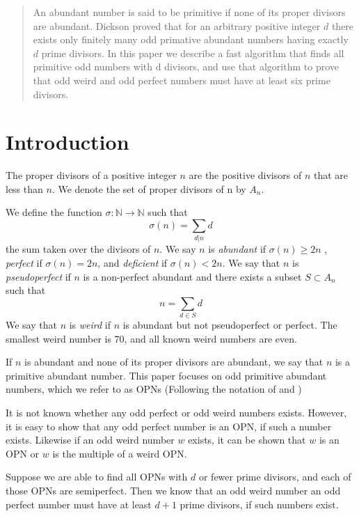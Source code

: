 \documentclass[../paper.tex]{article}
\begin{document}
\begin{abstract}
An abundant number is said to be primitive if none of its proper 
divisors are abundant.  Dickson proved that for an arbitrary
positive integer $d$ there exists only finitely many odd primative
abundant numbers having exactly $d$ prime divisors\cite{dickson}.
In this paper we describe a fast algorithm
that finds all primitive odd numbers with d divisors, and use that
algorithm to prove that odd weird and odd perfect numbers must
have at least six prime divisors.
\end{abstract}

\section{Introduction}
The proper divisors of a positive integer $n$ are the positive
divisors of $n$ that are less than $n$. We denote the set of 
proper divisors of n by $\textit{A}_{n}$.

We define the function 
%
$\sigma: \mathbb{N} \rightarrow \mathbb{N}$
%
such that
%
$$\sigma(n) = \sum_{d|n}d$$
%
the sum taken over the divisors of $n$. We say $n$ is 
\textit{abundant} if $\sigma(n) \geq 2n$ \footnotemark
, \textit{perfect} if $\sigma(n) = 2n$, and \textit{deficient} if 
$\sigma(n) < 2n$. We say that $n$ is \textit{pseudoperfect} if 
$n$ is a non-perfect abundant and there exists a subset $ S 
\subset \textit{A}_{n}$ such that
%
%
%
$$ n = \sum_{d \in S} d$$
%
We say that $n$ is \textit{weird} if $n$ is abundant but not 
pseudoperfect or perfect. The smallest weird number is 70, and 
all known weird numbers are even.

If $n$ is abundant and none of its proper divisors are abundant,
we say that $n$ is a primitive abundant number. This paper focuses
on odd primitive abundant numbers, which we refer to as OPNs
(Following the notation of \cite{valdas} and \cite{amato})

It is not known whether any odd perfect or odd weird numbers
exists. However, it is easy to show that any odd perfect number is
an OPN, if such a number exists. Likewise if an odd weird number
$w$ exists, it can be shown that $w$ is an OPN or $w$ is the
multiple of a weird OPN.

Suppose we are able to find all OPNs with $d$ or fewer prime divisors, 
and each of those OPNs are semiperfect. Then we know that an odd 
weird number an odd perfect number must have at least $d + 1$ prime 
divisors, if such numbers exist.
\end{document}
